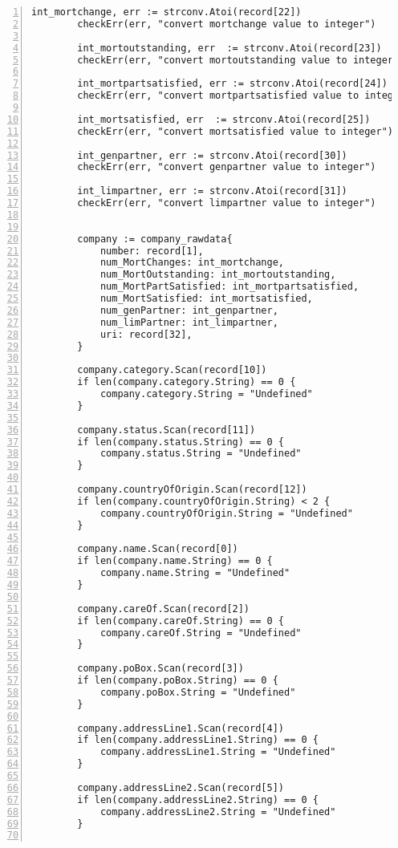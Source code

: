\begin{lstlisting}[breaklines, frame=single, numbers=left, caption={Parse and cleaned data retrieved from CSV}, label=commandline-02]
		int_mortchange, err := strconv.Atoi(record[22]) 
		checkErr(err, "convert mortchange value to integer") 
		
		int_mortoutstanding, err  := strconv.Atoi(record[23])
		checkErr(err, "convert mortoutstanding value to integer") 
		
		int_mortpartsatisfied, err := strconv.Atoi(record[24]) 
		checkErr(err, "convert mortpartsatisfied value to integer") 
		
		int_mortsatisfied, err  := strconv.Atoi(record[25])
		checkErr(err, "convert mortsatisfied value to integer") 
		
		int_genpartner, err := strconv.Atoi(record[30]) 
		checkErr(err, "convert genpartner value to integer")
		
		int_limpartner, err := strconv.Atoi(record[31])
		checkErr(err, "convert limpartner value to integer")
		
		
		company := company_rawdata{	
			number: record[1],
			num_MortChanges: int_mortchange, 
			num_MortOutstanding: int_mortoutstanding, 
			num_MortPartSatisfied: int_mortpartsatisfied, 
			num_MortSatisfied: int_mortsatisfied,
			num_genPartner: int_genpartner,
			num_limPartner: int_limpartner,
			uri: record[32],
		}
		
		company.category.Scan(record[10])
		if len(company.category.String) == 0 {
			company.category.String = "Undefined"
		}
		
		company.status.Scan(record[11])
		if len(company.status.String) == 0 {
			company.status.String = "Undefined"
		}
		
		company.countryOfOrigin.Scan(record[12])
		if len(company.countryOfOrigin.String) < 2 {
			company.countryOfOrigin.String = "Undefined"
		}
		
		company.name.Scan(record[0])
		if len(company.name.String) == 0 {
			company.name.String = "Undefined"
		}
		
		company.careOf.Scan(record[2])
		if len(company.careOf.String) == 0 {
			company.careOf.String = "Undefined"
		}
		
		company.poBox.Scan(record[3])
		if len(company.poBox.String) == 0 {
			company.poBox.String = "Undefined"
		}
		
		company.addressLine1.Scan(record[4])
		if len(company.addressLine1.String) == 0 {
			company.addressLine1.String = "Undefined"
		}
		
		company.addressLine2.Scan(record[5])
		if len(company.addressLine2.String) == 0 {
			company.addressLine2.String = "Undefined"
		}
		

\end{lstlisting}
